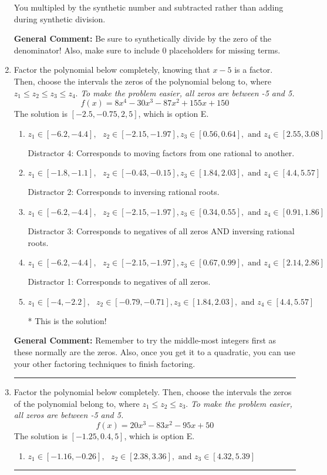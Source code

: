 \documentclass{extbook}[14pt]
\newcommand{\litem}[1]{\item #1

\rule{\textwidth}{0.4pt}}
\begin{document}
\begin{enumerate}
{\begin{enumerate}[label=\Alph*.]
 You multipled by the synthetic number and subtracted rather than adding during synthetic division.
\end{enumerate}

\textbf{General Comment:} Be sure to synthetically divide by the zero of the denominator! Also, make sure to include 0 placeholders for missing terms.
}
\litem{
Factor the polynomial below completely, knowing that $x -5$ is a factor. Then, choose the intervals the zeros of the polynomial belong to, where $z_1 \leq z_2 \leq z_3 \leq z_4$. \textit{To make the problem easier, all zeros are between -5 and 5.}
\[ f(x) = 8x^{4} -30 x^{3} -87 x^{2} +155 x + 150 \]The solution is \( [-2.5, -0.75, 2, 5] \), which is option E.\begin{enumerate}[label=\Alph*.]
\item \( z_1 \in [-6.2, -4.4], \text{   }  z_2 \in [-2.15, -1.97], z_3 \in [0.56, 0.64], \text{   and   } z_4 \in [2.55, 3.08] \)

 Distractor 4: Corresponds to moving factors from one rational to another.
\item \( z_1 \in [-1.8, -1.1], \text{   }  z_2 \in [-0.43, -0.15], z_3 \in [1.84, 2.03], \text{   and   } z_4 \in [4.4, 5.57] \)

 Distractor 2: Corresponds to inversing rational roots.
\item \( z_1 \in [-6.2, -4.4], \text{   }  z_2 \in [-2.15, -1.97], z_3 \in [0.34, 0.55], \text{   and   } z_4 \in [0.91, 1.86] \)

 Distractor 3: Corresponds to negatives of all zeros AND inversing rational roots.
\item \( z_1 \in [-6.2, -4.4], \text{   }  z_2 \in [-2.15, -1.97], z_3 \in [0.67, 0.99], \text{   and   } z_4 \in [2.14, 2.86] \)

 Distractor 1: Corresponds to negatives of all zeros.
\item \( z_1 \in [-4, -2.2], \text{   }  z_2 \in [-0.79, -0.71], z_3 \in [1.84, 2.03], \text{   and   } z_4 \in [4.4, 5.57] \)

* This is the solution!
\end{enumerate}

\textbf{General Comment:} Remember to try the middle-most integers first as these normally are the zeros. Also, once you get it to a quadratic, you can use your other factoring techniques to finish factoring.
}
\litem{
Factor the polynomial below completely. Then, choose the intervals the zeros of the polynomial belong to, where $z_1 \leq z_2 \leq z_3$. \textit{To make the problem easier, all zeros are between -5 and 5.}
\[ f(x) = 20x^{3} -83 x^{2} -95 x + 50 \]The solution is \( [-1.25, 0.4, 5] \), which is option E.\begin{enumerate}[label=\Alph*.]
\item \( z_1 \in [-1.16, -0.26], \text{   }  z_2 \in [2.38, 3.36], \text{   and   } z_3 \in [4.32, 5.39] \)


\end{enumerate}}
\end{enumerate}
\end{document}
